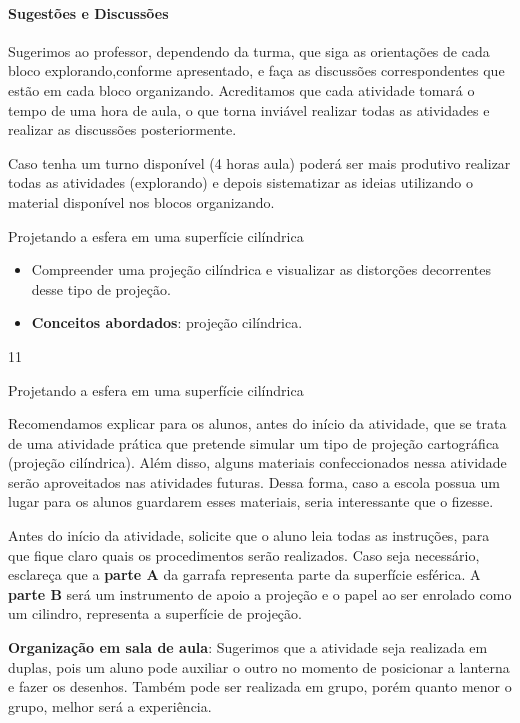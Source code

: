 {\begin{texto}
{\paragraph{Sugestões e Discussões}

Sugerimos ao professor, dependendo da turma, que siga as orientações de cada bloco explorando,conforme apresentado, e faça as discussões correspondentes que estão em cada bloco organizando. Acreditamos que cada atividade tomará o tempo de uma hora de aula, o que torna inviável realizar todas as atividades e realizar as discussões posteriormente.

Caso tenha um turno disponível (4 horas aula) poderá ser mais produtivo realizar todas as atividades (explorando) e depois sistematizar as ideias utilizando o material disponível nos blocos organizando.
}
\end{texto}
\begin{objectives}{Projetando a esfera em uma superfície cilíndrica}
{
  \begin{itemize}
  \item Compreender uma projeção cilíndrica e visualizar as distorções decorrentes desse tipo de projeção.

  \item \textbf{Conceitos abordados}: projeção cilíndrica.
  \end{itemize}    
}{1}{1}
\end{objectives}
\begin{sugestions}{Projetando a esfera em uma superfície cilíndrica}
{
  Recomendamos explicar para os alunos, antes do início da atividade, que se trata de uma atividade prática que pretende simular um tipo de projeção cartográfica (projeção cilíndrica). Além disso, alguns materiais confeccionados nessa atividade serão aproveitados nas atividades futuras. Dessa forma, caso a escola possua um lugar para os alunos guardarem esses materiais, seria interessante que o fizesse.
  
   Antes do início da atividade, solicite que o aluno leia todas as instruções, para que fique claro quais os procedimentos serão realizados. Caso seja necessário, esclareça que a \textbf{parte A} da garrafa representa parte da superfície esférica. A \textbf{parte B }será um instrumento de apoio a projeção e o papel ao ser enrolado como um cilindro, representa a superfície de projeção.

  \textbf{Organização em sala de aula}: Sugerimos que a atividade seja realizada em duplas, pois um aluno pode auxiliar o outro no momento de posicionar a lanterna e fazer os desenhos. Também pode ser realizada em grupo, porém quanto menor o grupo, melhor será a experiência.

}
\end{sugestions}}
